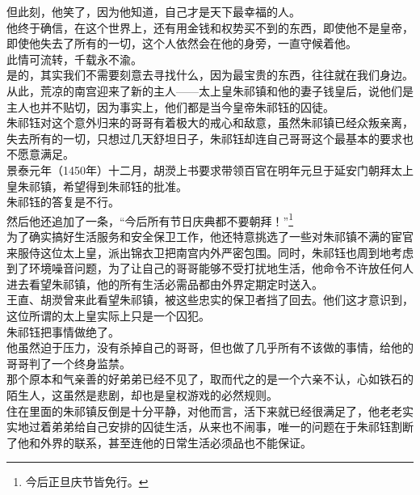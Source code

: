 \begin{multicols}{\theparacolNo}
但此刻，他笑了，因为他知道，自己才是天下最幸福的人。\\

他终于确信，在这个世界上，还有用金钱和权势买不到的东西，即使他不是皇帝，即使他失去了所有的一切，这个人依然会在他的身旁，一直守候着他。\\

此情可流转，千载永不渝。\\

是的，其实我们不需要刻意去寻找什么，因为最宝贵的东西，往往就在我们身边。\\

从此，荒凉的南宫迎来了新的主人——太上皇朱祁镇和他的妻子钱皇后，说他们是主人也并不贴切，因为事实上，他们都是当今皇帝朱祁钰的囚徒。\\

朱祁钰对这个意外归来的哥哥有着极大的戒心和敌意，虽然朱祁镇已经众叛亲离，失去所有的一切，只想过几天舒坦日子，朱祁钰却连自己哥哥这个最基本的要求也不愿意满足。\\

景泰元年（1450年）十二月，胡濙上书要求带领百官在明年元旦于延安门朝拜太上皇朱祁镇，希望得到朱祁钰的批准。\\

朱祁钰的答复是不行。\\

然后他还追加了一条，“今后所有节日庆典都不要朝拜！”\footnote{今后正旦庆节皆免行。}\\

为了确实搞好生活服务和安全保卫工作，他还特意挑选了一些对朱祁镇不满的宦官来服侍这位太上皇，派出锦衣卫把南宫内外严密包围。同时，朱祁钰也周到地考虑到了环境噪音问题，为了让自己的哥哥能够不受打扰地生活，他命令不许放任何人进去看望朱祁镇，他的所有生活必需品都由外界定期定时送入。\\

王直、胡濙曾来此看望朱祁镇，被这些忠实的保卫者挡了回去。他们这才意识到，这位所谓的太上皇实际上只是一个囚犯。\\

朱祁钰把事情做绝了。\\

他虽然迫于压力，没有杀掉自己的哥哥，但也做了几乎所有不该做的事情，给他的哥哥判了一个终身监禁。\\

那个原本和气亲善的好弟弟已经不见了，取而代之的是一个六亲不认，心如铁石的陌生人，这虽然是悲剧，却也是皇权游戏的必然规则。\\

住在里面的朱祁镇反倒是十分平静，对他而言，活下来就已经很满足了，他老老实实地过着弟弟给自己安排的囚徒生活，从来也不闹事，唯一的问题在于朱祁钰割断了他和外界的联系，甚至连他的日常生活必须品也不能保证。\\


\end{multicols}
